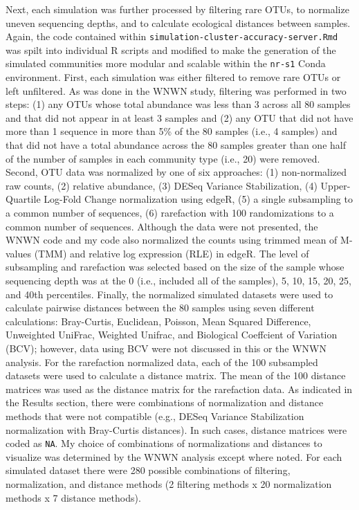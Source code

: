 \documentclass[
]{article}
\begin{document}
Next, each simulation was further processed by filtering rare OTUs, to
normalize uneven sequencing depths, and to calculate ecological
distances between samples. Again, the code contained within
\texttt{simulation-cluster-accuracy-server.Rmd} was spilt into
individual R scripts and modified to make the generation of the
simulated communities more modular and scalable within the
\texttt{nr-s1} Conda environment. First, each simulation was either
filtered to remove rare OTUs or left unfiltered. As was done in the WNWN
study, filtering was performed in two steps: (1) any OTUs whose total
abundance was less than 3 across all 80 samples and that did not appear
in at least 3 samples and (2) any OTU that did not have more than 1
sequence in more than 5\% of the 80 samples (i.e., 4 samples) and that
did not have a total abundance across the 80 samples greater than one
half of the number of samples in each community type (i.e., 20) were
removed. Second, OTU data was normalized by one of six approaches: (1)
non-normalized raw counts, (2) relative abundance, (3) DESeq Variance
Stabilization, (4) Upper-Quartile Log-Fold Change normalization using
edgeR, (5) a single subsampling to a common number of sequences, (6)
rarefaction with 100 randomizations to a common number of sequences.
Although the data were not presented, the WNWN code and my code also
normalized the counts using trimmed mean of M-values (TMM) and relative
log expression (RLE) in edgeR. The level of subsampling and rarefaction
was selected based on the size of the sample whose sequencing depth was
at the 0 (i.e., included all of the samples), 5, 10, 15, 20, 25, and
40th percentiles. Finally, the normalized simulated datasets were used
to calculate pairwise distances between the 80 samples using seven
different calculations: Bray-Curtis, Euclidean, Poisson, Mean Squared
Difference, Unweighted UniFrac, Weighted Unifrac, and Biological
Coeffcient of Variation (BCV); however, data using BCV were not
discussed in this or the WNWN analysis. For the rarefaction normalized
data, each of the 100 subsampled datasets were used to calculate a
distance matrix. The mean of the 100 distance matrices was used as the
distance matrix for the rarefaction data. As indicated in the Results
section, there were combinations of normalization and distance methods
that were not compatible (e.g., DESeq Variance Stabilization
normalization with Bray-Curtis distances). In such cases, distance
matrices were coded as \texttt{NA}. My choice of combinations of
normalizations and distances to visualize was determined by the WNWN
analysis except where noted. For each simulated dataset there were 280
possible combinations of filtering, normalization, and distance methods
(2 filtering methods x 20 normalization methods x 7 distance methods).
\end{document}
